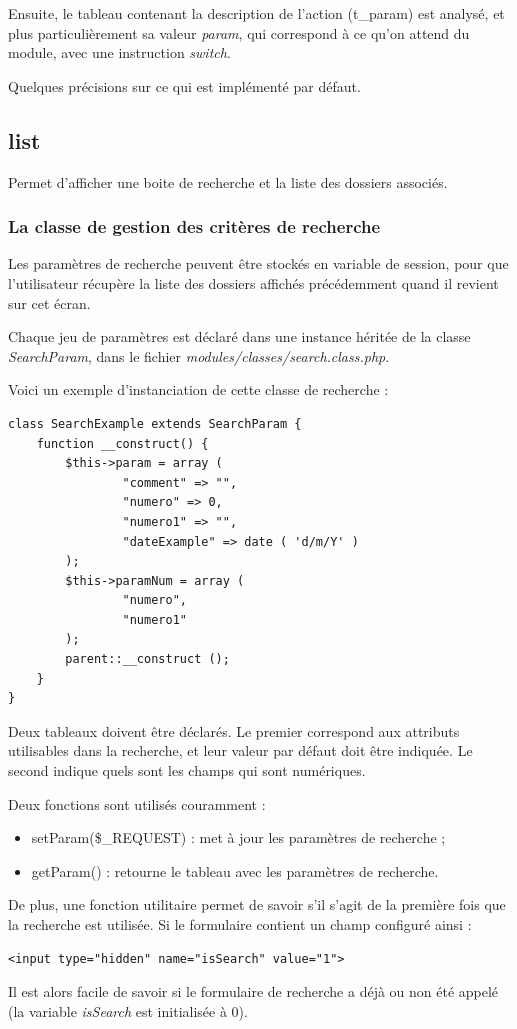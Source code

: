 Ensuite, le tableau contenant la description de l'action (t\_param) est analysé, et plus particulièrement sa valeur \textit{param}, qui correspond à ce qu'on attend du module, avec une instruction \textit{switch}.

Quelques précisions sur ce qui est implémenté par défaut.

\subsection{list}

Permet d'afficher une boite de recherche et la liste des dossiers associés. 

\subsubsection{La classe de gestion des critères de recherche}

Les paramètres de recherche peuvent être stockés en variable de session, pour que l'utilisateur récupère la liste des dossiers affichés précédemment quand il revient sur cet écran. 

Chaque jeu de paramètres est déclaré dans une instance héritée de la classe \textit{SearchParam}, dans le fichier \textit{modules/classes/search.class.php}.

Voici un exemple d'instanciation de cette classe de recherche :
\begin{lstlisting}
class SearchExample extends SearchParam {
	function __construct() {
		$this->param = array (
				"comment" => "",
				"numero" => 0,
				"numero1" => "",
				"dateExample" => date ( 'd/m/Y' ) 
		);
		$this->paramNum = array (
				"numero",
				"numero1" 
		);
		parent::__construct ();
	}
}
\end{lstlisting}

Deux tableaux doivent être déclarés. Le premier correspond aux attributs utilisables dans la recherche, et leur valeur par défaut doit être indiquée. Le second indique quels sont les champs qui sont numériques.

Deux fonctions sont utilisés couramment : 
\begin{itemize}
\item setParam(\$\_REQUEST) : met à jour les paramètres de recherche ;
\item getParam() : retourne le tableau avec les paramètres de recherche.
\end{itemize}

De plus, une fonction utilitaire permet de savoir s'il s'agit de la première fois que la recherche est utilisée. Si le formulaire contient un champ configuré ainsi :
\begin{lstlisting}
<input type="hidden" name="isSearch" value="1">
\end{lstlisting}
Il est alors facile de savoir si le formulaire de recherche a déjà ou non été appelé (la variable \textit{isSearch} est initialisée à 0).


